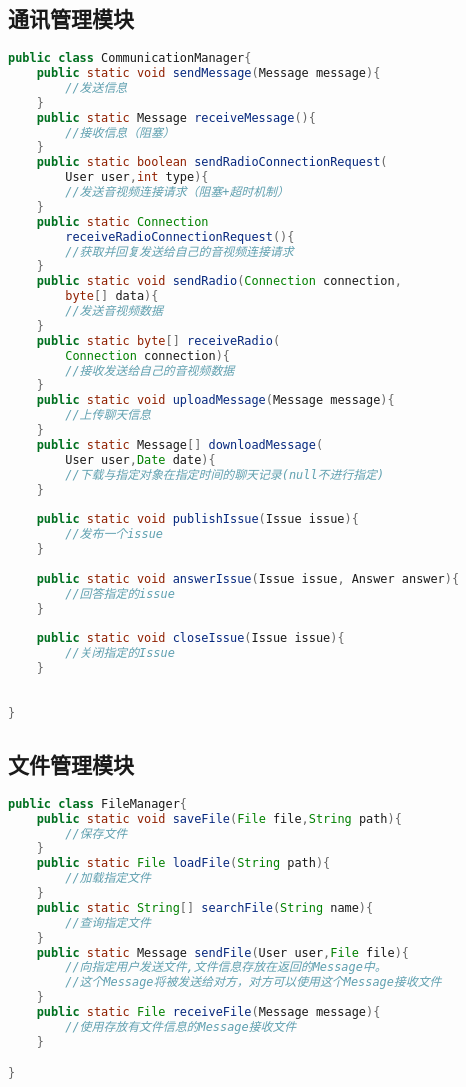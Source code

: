 \subsection{通讯管理模块}
{\color{red}

\begin{lstlisting}[language=Java, caption=通讯管理模块接口]
public class CommunicationManager{
    public static void sendMessage(Message message){
        //发送信息
    }
    public static Message receiveMessage(){
        //接收信息（阻塞）
    }
    public static boolean sendRadioConnectionRequest(
        User user,int type){
        //发送音视频连接请求（阻塞+超时机制）
    }
    public static Connection 
        receiveRadioConnectionRequest(){
        //获取并回复发送给自己的音视频连接请求
    }
    public static void sendRadio(Connection connection,
        byte[] data){
        //发送音视频数据
    }
    public static byte[] receiveRadio(
        Connection connection){
        //接收发送给自己的音视频数据
    }
    public static void uploadMessage(Message message){
        //上传聊天信息
    }
    public static Message[] downloadMessage(
        User user,Date date){
        //下载与指定对象在指定时间的聊天记录(null不进行指定)
    }
    
    public static void publishIssue(Issue issue){
        //发布一个issue
    }
    
    public static void answerIssue(Issue issue, Answer answer){
        //回答指定的issue
    }
    
    public static void closeIssue(Issue issue){
        //关闭指定的Issue
    }
    
    
}
\end{lstlisting}
}
\subsection{文件管理模块}
\begin{lstlisting}[language=Java, caption=文件管理模块接口]
public class FileManager{
    public static void saveFile(File file,String path){
        //保存文件
    }
    public static File loadFile(String path){
        //加载指定文件
    }
    public static String[] searchFile(String name){
        //查询指定文件
    }
    public static Message sendFile(User user,File file){
        //向指定用户发送文件,文件信息存放在返回的Message中。
        //这个Message将被发送给对方，对方可以使用这个Message接收文件
    }
    public static File receiveFile(Message message){
        //使用存放有文件信息的Message接收文件
    }

}
\end{lstlisting}

